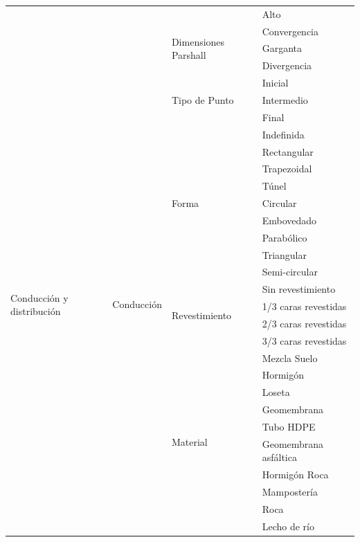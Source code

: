 \documentclass[]{article}
\begin{document}
\begin{longtable}{|p{3cm}|p{3.5cm}|p{3.5cm}|p{3.5cm}|}
    & & & Alto\\    \cline{3-4}
    & & \multirow {3}{3.5cm}{Dimensiones Parshall} & Convergencia\\    \cline{4-4}
    & & & Garganta\\    \cline{4-4}
    & & & Divergencia\\     \hline   
    \multirow {29}{3cm}{Conducción y distribución} & \multirow {29}{3.5cm}{Conducción} & \multirow {3}{3.5cm}{Tipo de Punto} &  Inicial\\	\cline{4-4}
	& & & Intermedio\\	\cline{4-4}
	& & & Final\\    \cline{3-4}
    & & \multirow {9}{3.5cm}{Forma} & Indefinida\\    \cline{4-4}
    & & & Rectangular\\    \cline{4-4}
    & & & Trapezoidal\\    \cline{4-4}
    & & & Túnel\\    \cline{4-4}
    & & & Circular\\    \cline{4-4}
    & & & Embovedado\\    \cline{4-4}
    & & & Parabólico\\    \cline{4-4}
    & & & Triangular\\    \cline{4-4}
    & & & Semi-circular\\    \cline{3-4}
	& & \multirow {4}{3.5cm}{Revestimiento} & Sin revestimiento\\    \cline{4-4}
    & & & 1/3 caras revestidas\\    \cline{4-4}
    & & & 2/3 caras revestidas\\    \cline{4-4}
    & & & 3/3 caras revestidas\\    \cline{3-4}  
    & & \multirow {13}{3.5cm}{Material} & Mezcla Suelo\\    \cline{4-4}
    & & & Hormigón\\    \cline{4-4}
    & & & Loseta\\    \cline{4-4}
    & & & Geomembrana\\    \cline{4-4}
    & & & Tubo HDPE\\    \cline{4-4}
    & & & Geomembrana asfáltica\\    \cline{4-4}
    & & & Hormigón Roca\\    \cline{4-4}
    & & & Mampostería\\    \cline{4-4}
    & & & Roca\\    \cline{4-4}
    & & & Lecho de río\\    \cline{4-4}

\end{longtable}
\end{document}
